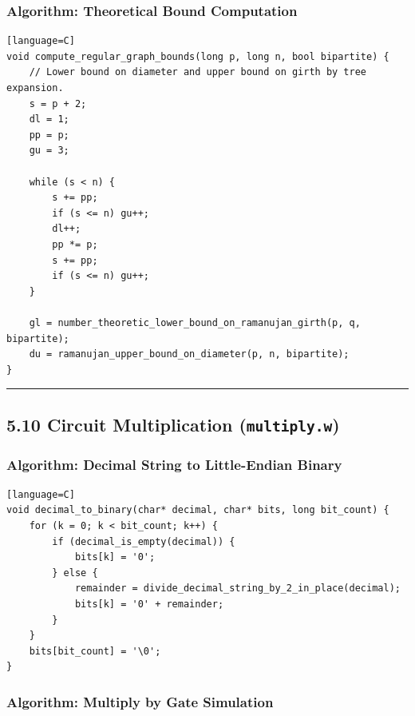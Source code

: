 \documentclass[11pt]{article}
\begin{document}
\subsubsection{Algorithm: Theoretical Bound Computation}\label{algorithm-theoretical-bound-computation}

\begin{verbatim}[language=C]
void compute_regular_graph_bounds(long p, long n, bool bipartite) {
    // Lower bound on diameter and upper bound on girth by tree expansion.
    s = p + 2;
    dl = 1;
    pp = p;
    gu = 3;

    while (s < n) {
        s += pp;
        if (s <= n) gu++;
        dl++;
        pp *= p;
        s += pp;
        if (s <= n) gu++;
    }

    gl = number_theoretic_lower_bound_on_ramanujan_girth(p, q, bipartite);
    du = ramanujan_upper_bound_on_diameter(p, n, bipartite);
}
\end{verbatim}

\begin{center}\rule{0.5\linewidth}{0.5pt}\end{center}

\subsection{\texorpdfstring{5.10 Circuit Multiplication (\texttt{multiply.w})}{5.10 Circuit Multiplication (multiply.w)}}\label{circuit-multiplication-multiply.w}

\subsubsection{Algorithm: Decimal String to Little-Endian Binary}\label{algorithm-decimal-string-to-little-endian-binary}

\begin{verbatim}[language=C]
void decimal_to_binary(char* decimal, char* bits, long bit_count) {
    for (k = 0; k < bit_count; k++) {
        if (decimal_is_empty(decimal)) {
            bits[k] = '0';
        } else {
            remainder = divide_decimal_string_by_2_in_place(decimal);
            bits[k] = '0' + remainder;
        }
    }
    bits[bit_count] = '\0';
}
\end{verbatim}

\subsubsection{Algorithm: Multiply by Gate Simulation}\label{algorithm-multiply-by-gate-simulation}
\end{document}
